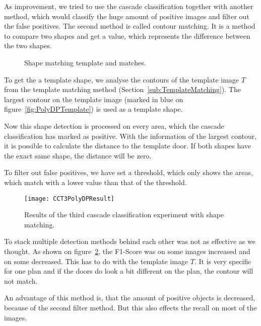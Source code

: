 As improvement, we tried to use the cascade classification together with another method, which would classify the huge amount of positive images and filter out the false positives. The second method is called contour matching. It is a method to compare two shapes and get a value, which represents the difference between the two shapes.

\begin{figure}[H]
	\centering
	\hfill
	\hfill
	\caption{Shape matching template and matches.}
	\label{fig:ShapeDistanceMatching}
\end{figure}

To get the a template shape, we analyse the contours of the template image $T$ from the template matching method (Section~\ref{sub:TemplateMatching}). The largest contour on the template image (marked in blue on figure~\ref{fig:PolyDPTemplate}) is used as a template shape.

Now this shape detection is processed on every area, which the cascade classification has marked as positive. With the information of the largest contour, it is possible to calculate the distance to the template door. If both shapes have the exact same shape, the distance will be zero.

To filter out false positives, we have set a threshold, which only shows the areas, which match with a lower value than that of the threshold.

\begin{figure}[H]
	\centering
	\texttt{[image: CCT3PolyDPResult]}
	\caption{Results of the third cascade classification experiment with shape matching.}
	\label{fig:CCT3PolyDPResult}
\end{figure}

To stack multiple detection methods behind each other was not as effective as we thought. As shown on figure~\ref{fig:CCT3PolyDPResult}, the F1-Score was on some images increased and on some decreased. This has to do with the template image $T$. It is very specific for one plan and if the doors do look a bit different on the plan, the contour will not match.

An advantage of this method is, that the amount of positive objects is decreased, because of the second filter method. But this also effects the recall on most of the images.

